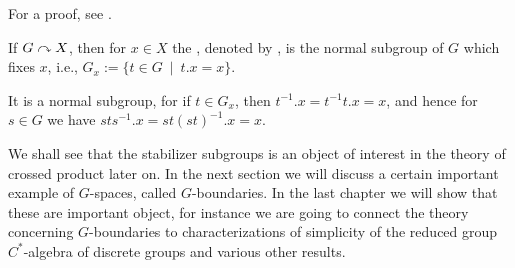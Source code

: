 For a proof, see \cite[Lemma 1.33, 2.5 and Proposition 2.6]{williamscrossed}.
\begin{definition}
	If $G \stackrel{}{\curvearrowright} X$, then for $x \in X$ the , denoted by , is the normal subgroup of $G$ which fixes $x$, i.e., $G_x := \{ t \in G \  \mid \ t.x = x\}$. 
\end{definition}
\begin{remark}
	It is a normal subgroup, for if $t \in G_x$, then $t^{-1}.x= t^{-1}t.x = x$, and hence for $s \in G$ we have $sts^{-1}.x= st(st)^{-1}.x=x$.
\end{remark}
We shall see that the stabilizer subgroups is an object of interest in the theory of crossed product later on. In the next section we will discuss a certain important example of $G$-spaces, called $G$-boundaries. In the last chapter we will show that these are important object, for instance we are going to connect the theory concerning $G$-boundaries to characterizations of simplicity of the reduced group $C^*$-algebra of discrete groups and various other results.

